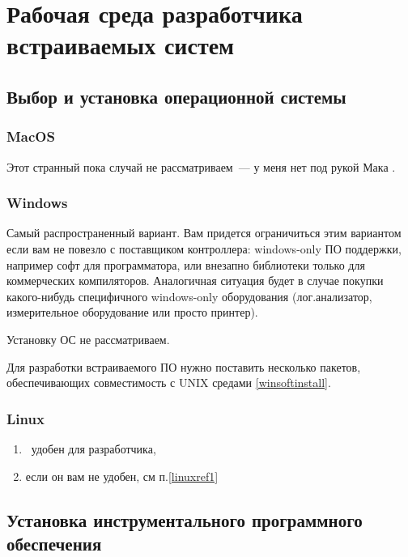 \chapter{Рабочая среда разработчика встраиваемых систем}


\section{Выбор и установка операционной системы}

\subsection{MacOS}

Этот странный пока случай не рассматриваем\ --- у меня нет под рукой Мака \smiley.

\subsection{Windows}

Самый распространенный вариант. Вам придется ограничиться этим вариантом если вам не повезло
с поставщиком контроллера: windows-only ПО поддержки, например софт для программатора, или
внезапно библиотеки только для коммерческих компиляторов. Аналогичная ситуация будет в случае
покупки какого-нибудь специфичного windows-only оборудования (лог.анализатор, измерительное 
оборудование или просто принтер).

Установку ОС не рассматриваем.


Для разработки встраиваемого ПО нужно поставить несколько пакетов, обеспечивающих
совместимость с UNIX средами \ref{winsoftinstall}.

\subsection{Linux}\label{linux}

\begin{enumerate}
\item \label{linuxref1}\linux\ удобен для разработчика, 
\item если он вам не удобен, см п.\ref{linuxref1}
\end{enumerate}



\section{Установка инструментального программного обеспечения}



